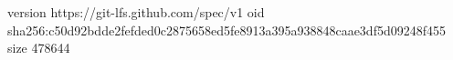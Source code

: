 version https://git-lfs.github.com/spec/v1
oid sha256:c50d92bdde2fefded0c2875658ed5fe8913a395a938848caae3df5d09248f455
size 478644
